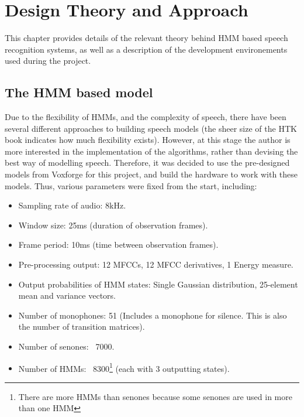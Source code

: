 \chapter{Design Theory and Approach} %
\label{cha:design_approach}



This chapter provides details of the relevant theory behind HMM based speech recognition systems, as well as a description of the development environements used during the project.

\section{The HMM based model} %
\label{sec:the_hmm_based_model}
	Due to the flexibility of HMMs, and the complexity of speech, there have been several different approaches to building speech models (the sheer size of the HTK book indicates how much flexibility exists).  However, at this stage the author is more interested in the implementation of the algorithms, rather than devising the best way of modelling speech.  Therefore, it was decided to use the pre-designed models from Voxforge for this project, and build the hardware to work with these models.  Thus, various parameters were fixed from the start, including:

	\begin{itemize}
		\item Sampling rate of audio: 8kHz. %
		\item Window size: 25ms (duration of observation frames).
		\item Frame period: 10ms (time between observation frames).
		\item Pre-processing output: 12 MFCCs, 12 MFCC derivatives, 1 Energy measure.
		\item Output probabilities of HMM states: Single Gaussian distribution, 25-element mean and variance vectors.
		\item Number of monophones: 51 (Includes a monophone for silence.  This is also the number of transition matrices).
		\item Number of senones: ~7000.
		\item Number of HMMs: ~8300\footnote{There are more HMMs than senones because some senones are used in more than one HMM} (each with 3 outputting states).
	\end{itemize}

